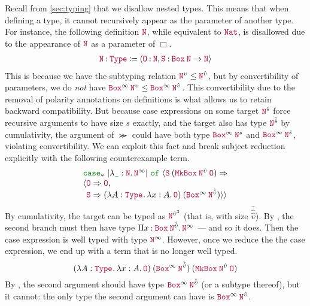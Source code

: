 Recall from \autoref{sec:typing} that we disallow nested \coinductive types.
This means that when defining a \coinductive type, it cannot recursively appear as the parameter of another type.
For instance, the following definition $\nat$, while equivalent to $\Nat$,
is disallowed due to the appearance of $\nat$ as a parameter of $\Box$.
\begin{align*}
  \defn{\nat}{\Type{}}{\seq{\assm{\Zero}{\nat}, \assm{\Succ}{\app{\Box}{\nat} \to \nat}}}
\end{align*}
This is because we have the subtyping relation $\nat^\upsilon \leq \nat^{\hat{\upsilon}}$,
but by convertibility of parameters,
we do \emph{not} have $\app{\Box^\infty}{\nat^\upsilon} \leq \app{\Box^\infty}{\nat^{\hat{\upsilon}}}$.
This convertibility due to the removal of polarity annotations on \coinductive definitions is what allows us to retain backward compatibility.
But because case expressions on some target $\nat^{\hat{s}}$ force recursive arguments to have size $s$ exactly,
and the target also has type $\nat^{\hat{\hat{s}}}$ by cumulativity,
the argument of $\Succ$ could have both type $\app{\Box^\infty}{\nat^s}$ and $\app{\Box^\infty}{\nat^{\hat{s}}}$, violating convertibility.
We can exploit this fact and break subject reduction explicitly with the following counterexample term.
\begin{displaymath}
\begin{array}{l}
  \caseof*{\erase{\abs{\any}{\nat}{\nat^\infty}}}{\app{\Succ}{(\app{\MkBox}{\nat^{\hat{\upsilon}}}{\Zero})}}{\\
  \seq{\Zero \Rightarrow \Zero,\\
  \phantom{\langle} \Succ \Rightarrow \app{(\abs{A}{\Type{}}{\abs{x}{A}{\Zero}})}{(\app{\Box^\infty}{\nat^{\hat{\hat{\upsilon}}}})}}}
\end{array}
\end{displaymath}
By cumulativity, the target can be typed as $\nat^{\hat{\upsilon}^{3}}$ (that is, with size $\hat{\hat{\hat{\upsilon}}}$).
By , the second branch must then have type $\prod{x}{\app{\Box}{\nat^{\hat{\hat{\upsilon}}}}}{\nat^\infty}$ --- and so it does.
Then the case expression is well typed with type $\nat^\infty$.
However, once we reduce the the case expression, we end up with a term that is no longer well typed.
\begin{displaymath}
  \app{(\abs{A}{\Type{}}{\abs{x}{A}{\Zero}})}
    {(\app{\Box^\infty}{\nat^{\hat{\hat{\upsilon}}}})}
    {(\app{\MkBox}{\nat^{\hat{\upsilon}}}{\Zero})}
\end{displaymath}
By , the second argument should have type $\app{\Box^\infty}{\nat^{\hat{\hat{\upsilon}}}}$ (or a subtype thereof), but it cannot:
the only type the second argument can have is $\app{\Box^\infty}{\nat^{\hat{\upsilon}}}$.

